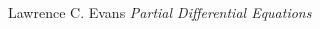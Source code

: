 %
%
%
%
%
%
%
%

\begin{thebibliography}{9}

Lawrence C. Evans
\textit{Partial Differential Equations}

\end{thebibliography}

 